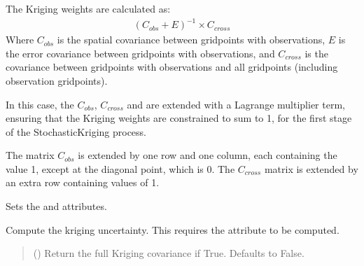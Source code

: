\documentclass[letterpaper,10pt,english]{sphinxmanual}
\begin{document}
\begin{fulllineitems}
\begin{fulllineitems}
\sphinxAtStartPar
The Kriging weights are calculated as:
\begin{equation*}
\begin{split}(C_{obs} + E)^{-1} \times C_{cross}\end{split}
\end{equation*}
\sphinxAtStartPar
Where \(C_{obs}\) is the spatial covariance between grid\sphinxhyphen{}points
with observations, \(E\) is the error covariance between grid\sphinxhyphen{}points
with observations, and \(C_{cross}\) is the covariance between
grid\sphinxhyphen{}points with observations and all grid\sphinxhyphen{}points (including observation
grid\sphinxhyphen{}points).

\sphinxAtStartPar
In this case, the \(C_{obs}\), \(C_{cross}\) and are extended
with a Lagrange multiplier term, ensuring that the Kriging weights are
constrained to sum to 1, for the first stage of the StochasticKriging
process.

\sphinxAtStartPar
The matrix \(C_{obs}\) is extended by one row and one column, each
containing the value 1, except at the diagonal point, which is 0. The
\(C_{cross}\) matrix is extended by an extra row containing values
of 1.

\sphinxAtStartPar
Sets the  and  attributes.
\begin{quote}\begin{description}
\sphinxAtStartPar
{}

\end{description}\end{quote}

\end{fulllineitems}


\begin{fulllineitems}
\label{\detokenize{kriging:glomar_gridding.stochastic.StochasticKriging.get_uncertainty}}
\pysigstartsignatures
\pysiglinewithargsret
{}
{}
{}
\pysigstopsignatures
\sphinxAtStartPar
Compute the kriging uncertainty. This requires the attribute
 to be computed.
\begin{quote}\begin{description}
\sphinxAtStartPar
{} () \textendash{} Return the full Kriging covariance if True. Defaults to False.


\end{description}
\end{quote}
\end{fulllineitems}
\end{fulllineitems}
\end{document}
